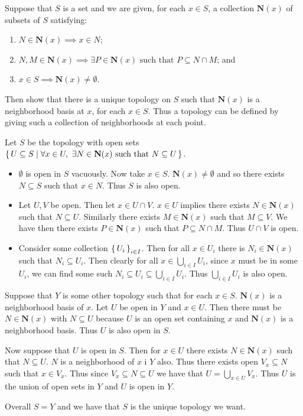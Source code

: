 \documentclass[letterpaper, 11pt, oneside]{book}
\begin{document}
\begin{exercise}
  Suppose that $S$ is a set and we are given, for each $x \in S$, a collection $\textbf{N}(x)$ of subsets of $S$ satisfying:
  \begin{enumerate}
  \item $N \in \textbf{N}(x) \implies x \in N$;
  \item $N, M \in \textbf{N}(x) \implies \exists P \in \textbf{N}(x) \text{ such that } P \subseteq N \cap M$; and
  \item $x \in S \implies \textbf{N}(x) \neq \emptyset$.
  \end{enumerate}
  Then show that there is a unique topology on $S$ such that $\textbf{N}(x)$ is a neighborhood basis at $x$, for each $x \in S$.
  Thus a topology can be defined by giving such a collection of neighborhoods at each point.
\end{exercise}
\begin{pf}
  Let $S$ be the topology with open sets $\set{U \subseteq S | \forall x \in U,~ \exists N \in \textbf{N}(x) \text{ such that } N \subseteq U}$.
  \begin{itemize}
  \item $\emptyset$ is open in $S$ vacuously.
        Now take $x \in S$.
        $\textbf{N}(x) \neq \emptyset$ and so there exists $N \subseteq S$ such that $x \in N$.
        Thus $S$ is also open.
  \item Let $U, V$ be open.
        Then let $x \in U \cap V$.
        $x \in U$ implies there exists $N \in \textbf{N}(x)$ such that $N \subseteq U$.
        Similarly there exists $M \in \textbf{N}(x)$ such that $M \subseteq V$.
        We have then there exists $P \in \textbf{N}(x)$ such that $P \subseteq N \cap M$.
        Thus $U \cap V$ is open.
  \item Consider some collection $\set{U_{i}}_{i \in I}$.
        Then for all $x \in U_{i}$ there is $N_{i} \in \textbf{N}(x)$ such that $N_{i} \subseteq U_{i}$.
        Then clearly for all $x \in \bigcup_{i \in I} U_{i}$, since $x$ must be in some $U_{i}$, we can find some such $N_{i} \subseteq U_{i} \subseteq \bigcup_{i \in I} U_{i}$.
        Thus $\bigcup_{i \in I} U_{i}$ is also open.
  \end{itemize}

  Suppose that $Y$ is some other topology such that for each $x \in S$. $\textbf{N}(x)$ is a neighborhood basis of $x$.
  Let $U$ be open in $Y$ and $x \in U$.
  Then there must be $N \in \textbf{N}(x)$ with $N \subseteq U$ because $U$ is an open set containing $x$ and $\textbf{N}(x)$ is a neighborhood basis.
  Thus $U$ is also open in $S$.

  Now suppose that $U$ is open in $S$.
  Then for $x \in  U$ there exists $N \in \textbf{N}(x)$ such that $N \subseteq U$.
  $N$ is a neighborhood of $x$ i $Y$ also.
  Thus there exists open $V_{x} \subseteq N$ such that $x \in V_{x}$.
  Thus since $V_{x} \subseteq N \subseteq U$ we have that $U = \bigcup_{x \in U} V_{x}$.
  Thus $U$ is the union of open sets in $Y$ and $U$ is open in $Y$.

  Overall $S = Y$ and we have that $S$ is the unique topology we want.
\end{pf}
\end{document}
